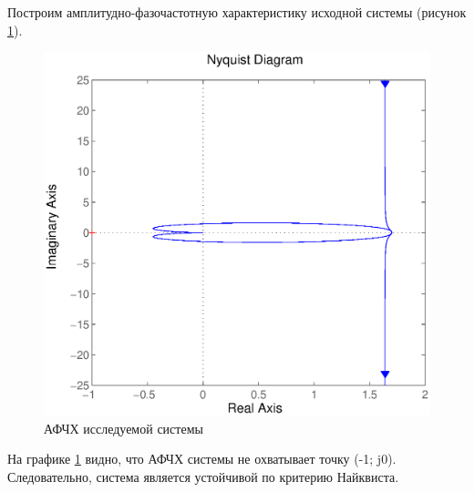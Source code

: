 \documentclass[12pt,a4paper]{article}
\begin{document}
Построим амплитудно-фазочастотную характеристику исходной системы (рисунок \ref{nyquist}).\par
\begin{figure}[H]
	\centering
	\includegraphics[width=0.7\linewidth]{nyquist}
	\caption{АФЧХ исследуемой системы}
	\label{nyquist}
\end{figure}
На графике \ref{nyquist} видно, что АФЧХ системы не охватывает точку (-1; j0). Следовательно, система является устойчивой по критерию Найквиста.

\newpage
\end{document}
